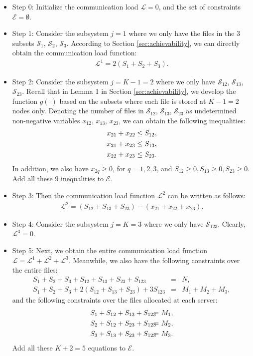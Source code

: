 \documentclass[conference]{IEEEtran}
\begin{document}
\begin{itemize}
\item{Step 0:} Initialize the communication load $\mathcal{L}=0$, and the set of constraints $\mathcal{E}=\emptyset$.

\item{Step 1:} Consider the subsystem $j=1$ where we only have the files in the 3 subsets $\mathcal{S}_1$, $\mathcal{S}_2$, $\mathcal{S}_3$. According to Section \ref{sec:achievability}, we can directly obtain the communication load function:
    \begin{eqnarray}
    \mathcal{L}^1=2(S_1+S_2+S_3).
    \end{eqnarray}

\item{Step 2:} Consider the subsystem $j=K-1=2$ where we only have $\mathcal{S}_{12}$, $\mathcal{S}_{13}$, $\mathcal{S}_{23}$. Recall that in Lemma 1 in Section \ref{sec:achievability}, we develop the function $g(\cdot)$ based on the subsets where each file is stored at $K-1=2$ nodes only. Denoting the number of files in $\mathcal{S}_{12}$, $\mathcal{S}_{13}$, $\mathcal{S}_{23}$ as undetermined non-negative variables $x_{12}$, $x_{13}$, $x_{23}$, we can obtain the following inequalities:
    \begin{eqnarray}
    x_{21}+x_{22}\leq S_{12},\notag\\
    x_{21}+x_{23}\leq S_{13},\\
    x_{22}+x_{23}\leq S_{23}.\notag
    \end{eqnarray}
    In addition, we also have $x_{2q}\geq 0$, for $q=1,2,3$, and $S_{12}\geq 0,S_{13}\geq 0,S_{23}\geq 0$. Add all these $9$ inequalities to $\mathcal{E}$.

\item{Step 3:} Then the communication load function $\mathcal{L}^2$ can be written as follows:
\begin{eqnarray}
\mathcal{L}^2=(S_{12}+S_{13}+S_{23})-(x_{21}+x_{22}+x_{23}).
\end{eqnarray}

\item{Step 4:} Consider the subsystem $j=K=3$ where we only have $\mathcal{S}_{123}$. Clearly, $\mathcal{L}^3=0$.

\item{Step 5:} Next, we obtain the entire communication load function $\mathcal{L}=\mathcal{L}^1+\mathcal{L}^2+\mathcal{L}^3$. Meanwhile, we also have the following constraints over the entire files:
\begin{eqnarray}
S_1+S_2+S_3+S_{12}+S_{13}+S_{23}+S_{123}&\!\!\!\!=\!\!\!\!&N,\\
S_1+S_2+S_3+2(S_{12}+S_{13}+S_{23})+3S_{123}&\!\!\!\!=\!\!\!\!&M_1+M_2+M_3,
\end{eqnarray}
and the following constraints over the files allocated at each server:
\begin{eqnarray}
S_1+S_{12}+S_{13}+S_{123}&\!\!\!\!=\!\!\!\!&M_1,\notag\\
S_2+S_{12}+S_{23}+S_{123}&\!\!\!\!=\!\!\!\!&M_2,\\
S_3+S_{13}+S_{23}+S_{123}&\!\!\!\!=\!\!\!\!&M_3.\notag
\end{eqnarray}
Add all these $K+2=5$ equations to $\mathcal{E}$.


\end{itemize}
\end{document}
